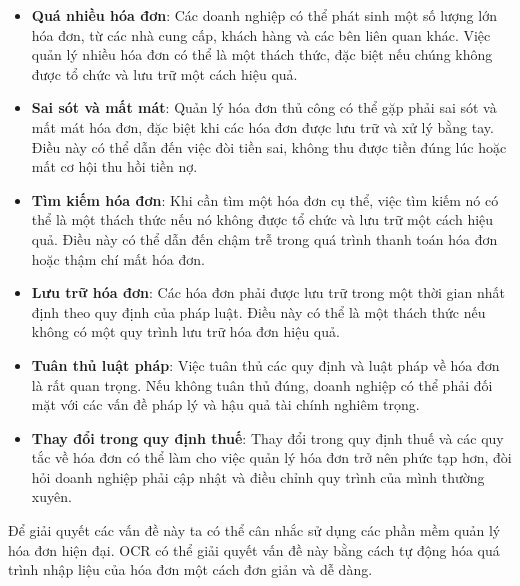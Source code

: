 \begin{itemize}
    \item \textbf{Quá nhiều hóa đơn}: Các doanh nghiệp có thể phát sinh một số lượng lớn hóa đơn, từ các nhà cung cấp, khách hàng và các bên liên quan khác. Việc quản lý nhiều hóa đơn có thể là một thách thức, đặc biệt nếu chúng không được tổ chức và lưu trữ một cách hiệu quả.
    \item \textbf{Sai sót và mất mát}: Quản lý hóa đơn thủ công có thể gặp phải sai sót và mất mát hóa đơn, đặc biệt khi các hóa đơn được lưu trữ và xử lý bằng tay. Điều này có thể dẫn đến việc đòi tiền sai, không thu được tiền đúng lúc hoặc mất cơ hội thu hồi tiền nợ. 
    \item \textbf{Tìm kiếm hóa đơn}: Khi cần tìm một hóa đơn cụ thể, việc tìm kiếm nó có thể là một thách thức nếu nó không được tổ chức và lưu trữ một cách hiệu quả. Điều này có thể dẫn đến chậm trễ trong quá trình thanh toán hóa đơn hoặc thậm chí mất hóa đơn.
    \item \textbf{Lưu trữ hóa đơn}: Các hóa đơn phải được lưu trữ trong một thời gian nhất định theo quy định của pháp luật. Điều này có thể là một thách thức nếu không có một quy trình lưu trữ hóa đơn hiệu quả.
    \item \textbf{Tuân thủ luật pháp}: Việc tuân thủ các quy định và luật pháp về hóa đơn là rất quan trọng. Nếu không tuân thủ đúng, doanh nghiệp có thể phải đối mặt với các vấn đề pháp lý và hậu quả tài chính nghiêm trọng.
    \item \textbf{Thay đổi trong quy định thuế}: Thay đổi trong quy định thuế và các quy tắc về hóa đơn có thể làm cho việc quản lý hóa đơn trở nên phức tạp hơn, đòi hỏi doanh nghiệp phải cập nhật và điều chỉnh quy trình của mình thường xuyên.
\end{itemize}

\indent Để giải quyết các vấn đề này ta có thể cân nhắc sử dụng các phần mềm quản lý hóa đơn hiện đại. OCR có thể giải quyết vấn đề này bằng cách tự động hóa quá trình nhập liệu của hóa đơn một cách đơn giản và dễ dàng.


